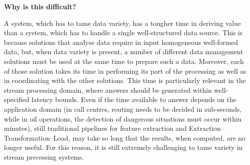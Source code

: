 \textbf{Why is this difficult?}

A system, which has to tame data variety, has a tougher time in deriving value than a system, which has to handle a single well-structured data source. This is because solutions that analyse data require in input homogeneous well-formed data, but, when data variety is present, a number of different data management solutions must be used at the same time to prepare such a data. Moreover, each of those solution takes its time in performing its part of the processing as well as in coordinating with the other solutions. This time is particularly relevant in the stream processing domain, where answers should be generated within well-specified latency bounds. Even if the time available to answer depends on the application domain (in call centres, routing needs to be decided in sub-seconds, while in oil operations, the detection of dangerous situations must occur within minutes), still traditional pipelines for feature extraction and Extraction--Transformation--Load, may take so long
that the results, when computed, are no longer useful. For this reason, it is still extremely challenging to tame variety in stream precessing systems.


